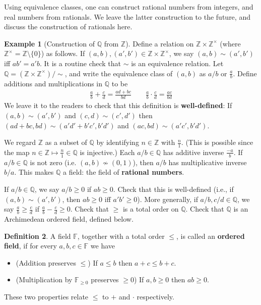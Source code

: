 \documentclass[12pt,b5paper,notitlepage]{article}
\theoremstyle{definition}
\newtheorem{df}{Definition}[section]
\newtheorem{eg}[df]{Example}
\theoremstyle{plain}
\newcommand{\Zbb}{\mathbb Z}
\newcommand{\Qbb}{\mathbb Q}
\newcommand{\Fbb}{\mathbb F}
\numberwithin{equation}{section}
\begin{document}
Using equivalence classes, one can construct rational numbers from integers, and real numbers from rationals. We leave the latter construction to the future, and discuss the construction of rationals here.

\begin{eg}[Construction of $\Qbb$ from $\Zbb$]\label{lb17}
Define a relation on $\Zbb\times\Zbb^\times$ (where $\Zbb^\times=\Zbb\setminus\{0\}$) as follows. If $(a,b),(a',b')\in\Zbb\times\Zbb^\times$, we say $(a,b)\sim(a',b')$ iff $ab'=a'b$. It is a routine check that $\sim$ is an equivalence relation. Let \index{Q@$\Qbb$, the field of rational numbers}  $\Qbb=(\Zbb\times\Zbb^\times)/\sim$, and write the equivalence class of $(a,b)$ as $a/b$ or $\frac ab$. Define additions and multiplications in $\Qbb$ to be
\begin{align*}
\frac ab+\frac cd=\frac{ad+bc}{bd}\qquad \frac ab\cdot\frac cd=\frac{ac}{bd}
\end{align*}
We leave it to the readers to check that this definition is  \textbf{well-defined}: If $(a,b)\sim(a',b')$ and $(c,d)\sim(c',d')$ then $(ad+bc,bd)\sim(a'd'+b'c',b'd')$ and $(ac,bd)\sim(a'c',b'd')$.

We regard $\Zbb$ as a subset of $\Qbb$ by identifying $n\in\Zbb$ with $\frac n1$. (This is possible since the map $n\in\Zbb\mapsto \frac n1\in\Qbb$ is injective.) Each $a/b\in\Qbb$ has additive inverse $\frac{-a}b$. If $a/b\in\Qbb$ is not zero (i.e. $(a,b)\nsim (0,1)$), then $a/b$ has multiplicative inverse $b/a$. This makes $\Qbb$ a field: the field of \textbf{rational numbers}.

If $a/b\in\Qbb$, we say $a/b\geq 0$ if $ab\geq0$. Check that this is well-defined (i.e., if $(a,b)\sim(a',b')$, then $ab\geq0$ iff $a'b'\geq0$). More generally, if $a/b,c/d\in\Qbb$, we say $\frac ab\geq \frac cd$ if $\frac ab-\frac cd\geq0$. Check that $\geq$ is a total order on $\Qbb$.  Check that $\Qbb$ is an Archimedean ordered field, defined below.\hfill\qedsymbol
\end{eg}


\begin{df}\label{lb161}
A field $\Fbb$, together with a total order $\leq$, is called an  \textbf{ordered field}, if for every $a,b,c\in\Fbb$ we have
\begin{itemize}
\item (Addition preserves $\leq$) If $a\leq b$ then $a+c\leq b+c$.
\item (Multiplication by $\Fbb_{\geq0}$ preserves $\geq0$) If $a,b\geq 0$ then $ab\geq0$.
\end{itemize}
These two properties relate $\leq$ to $+$ and $\cdot$ respectively.
\end{df}
\end{document}
